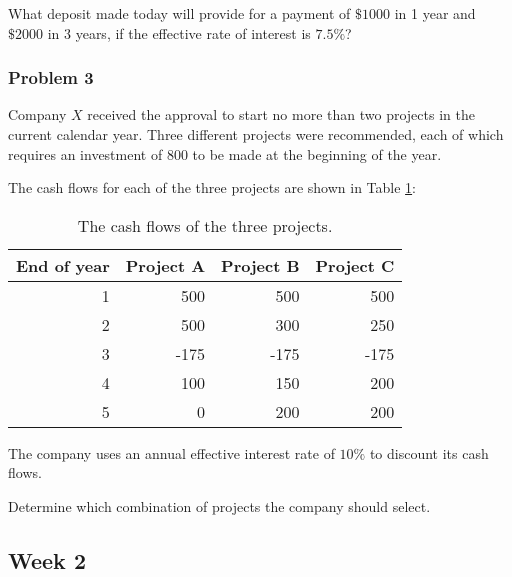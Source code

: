 \documentclass[
]{book}
\begin{document}
What deposit made today will provide for a payment of \(\$1000\) in 1 year and \(\$2000\) in 3 years, if the effective rate of interest is \(7.5\%\)?

\hypertarget{problem-3}{%
\subsubsection*{Problem 3}\label{problem-3}}

Company \(X\) received the approval to start no more than two projects in the current calendar year.
Three different projects were recommended, each of which requires an investment of 800 to be made at the beginning of the year.

The cash flows for each of the three projects are shown in Table \ref{tab:week1}:

\begin{table}

\caption{\label{tab:week1}The cash flows of the three projects.}
\centering
\begin{tabular}[t]{r|r|r|r}
\hline
End of year & Project A & Project B & Project C\\
\hline
1 & 500 & 500 & 500\\
\hline
2 & 500 & 300 & 250\\
\hline
3 & -175 & -175 & -175\\
\hline
4 & 100 & 150 & 200\\
\hline
5 & 0 & 200 & 200\\
\hline
\end{tabular}
\end{table}

The company uses an annual effective interest rate of \(10\%\) to discount its cash flows.

Determine which combination of projects the company should select.

\hypertarget{week-2}{%
\subsection*{Week 2}\label{week-2}}

  
\end{document}

